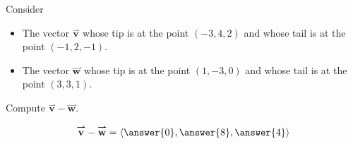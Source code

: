 \documentclass{ximera}
\author{Bart Snapp}
\begin{document}
\begin{exercise}
  Consider
  \begin{itemize}
    \item The vector $\overset{\boldsymbol{\rightharpoonup}}{\mathbf{v}}$ whose tip is at the point $(-3,4,2)$
      and whose tail is at the point $(-1,2,-1)$.
    \item The vector $\overset{\boldsymbol{\rightharpoonup}}{\mathbf{w}}$ whose tip is at the point $(1,-3,0)$
      and whose tail is at the point $(3,3,1)$.
  \end{itemize}
  Compute $\overset{\boldsymbol{\rightharpoonup}}{\mathbf{v}}-\overset{\boldsymbol{\rightharpoonup}}{\mathbf{w}}$.
  \begin{prompt}
    \[
    \overset{\boldsymbol{\rightharpoonup}}{\mathbf{v}} - \overset{\boldsymbol{\rightharpoonup}}{\mathbf{w}} = \left\langle \answer{0},\answer{8},\answer{4} \right\rangle
    \]
  \end{prompt}
\end{exercise}
\end{document}
